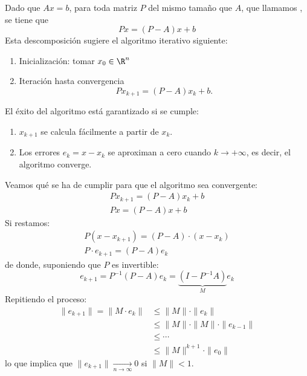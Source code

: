 Dado que $Ax=b$, para toda matriz $P$ del mismo tamaño que $A$, que llamamos , se tiene que \[ Px=(P-A)x+b \]Esta descomposición sugiere el algoritmo iterativo siguiente:
\begin{enumerate}[label=\color{lightblue}\arabic*)]
	\item Inicialización: tomar $x_0\in\R^n$
	\item Iteración hasta convergencia \[ Px_{k+1}=(P-A)x_k+b. \]
\end{enumerate}
El éxito del algoritmo está garantizado si se cumple:
\begin{enumerate}[label=\color{lightblue}\arabic*)]
	\item $x_{k+1}$ se calcula fácilmente a partir de $x_k$.
	\item Los errores $e_k=x-x_k$ se aproximan a cero cuando $k\to+\infty$, es decir, el algoritmo converge.
\end{enumerate}
Veamos qué se ha de cumplir para que el algoritmo sea convergente:\[ \begin{array}{l}
	Px_{k+1}=(P-A)x_k+b\\
	Px=(P-A)x+b
\end{array} \]Si restamos:\[ \begin{array}{l}
P(x-x_{k+1})=(P-A)\cdot(x-x_k)\\
P\cdot e_{k+1}=(P-A)e_k
\end{array} \]de donde, suponiendo que $P$ es invertible: \[ e_{k+1}=P^{-1}(P-A)e_k=\underbrace{(I-P^{-1}A)}_{M}e_k \]Repitiendo el proceso: \[ \begin{aligned}
\|e_{k+1}\|=\|M\cdot e_k\|&\le\|M\|\cdot\|e_k\|\\
&\le\|M\|\cdot\|M\|\cdot\|e_{k-1}\|\\
&\le \cdots\\
&\le\|M\|^{k+1}\cdot\|e_0\|
\end{aligned} \]lo que implica que $\|e_{k+1}\|\xrightarrow[n\to\infty]{}0$ si $\|M\|<1$.

